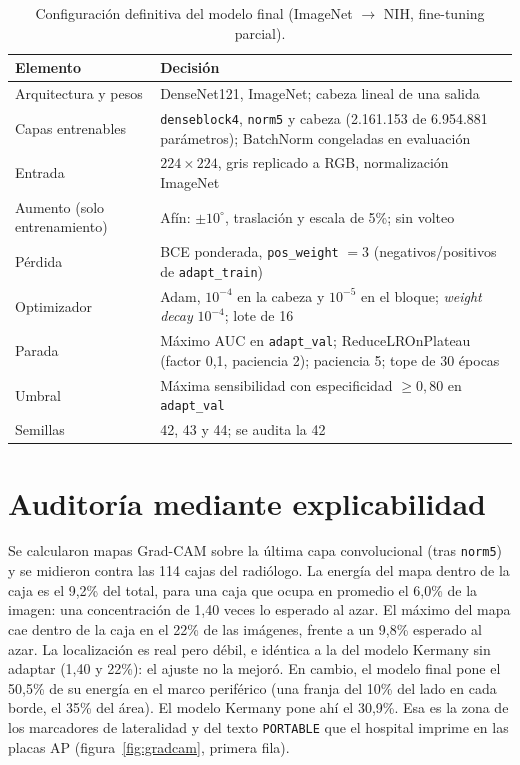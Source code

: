\documentclass[11pt]{article}
\begin{document}
\begin{table}[h]\centering\small
\caption{Configuración definitiva del modelo final (ImageNet $\rightarrow$ NIH, fine-tuning parcial).}\label{tab:config}
\begin{tabular}{ll}\toprule
Elemento & Decisión \\\midrule
Arquitectura y pesos & DenseNet121, ImageNet; cabeza lineal de una salida \\
Capas entrenables & \texttt{denseblock4}, \texttt{norm5} y cabeza (2.161.153 de 6.954.881 parámetros); BatchNorm congeladas en evaluación \\
Entrada & $224\times224$, gris replicado a RGB, normalización ImageNet \\
Aumento (solo entrenamiento) & Afín: $\pm10^\circ$, traslación y escala de 5\%; sin volteo \\
Pérdida & BCE ponderada, \texttt{pos\_weight} $=3$ (negativos/positivos de \texttt{adapt\_train}) \\
Optimizador & Adam, $10^{-4}$ en la cabeza y $10^{-5}$ en el bloque; \emph{weight decay} $10^{-4}$; lote de 16 \\
Parada & Máximo AUC en \texttt{adapt\_val}; ReduceLROnPlateau (factor 0,1, paciencia 2); paciencia 5; tope de 30 épocas \\
Umbral & Máxima sensibilidad con especificidad $\geq0{,}80$ en \texttt{adapt\_val} \\
Semillas & 42, 43 y 44; se audita la 42 \\\bottomrule
\end{tabular}
\end{table}

\section{Auditoría mediante explicabilidad}\label{sec:auditoria}
Se calcularon mapas Grad-CAM \parencite{selvaraju2017} sobre la última capa convolucional (tras \texttt{norm5}) y se midieron contra las 114 cajas del radiólogo. La energía del mapa dentro de la caja es el 9,2\% del total, para una caja que ocupa en promedio el 6,0\% de la imagen: una concentración de 1,40 veces lo esperado al azar. El máximo del mapa cae dentro de la caja en el 22\% de las imágenes, frente a un 9,8\% esperado al azar. La localización es real pero débil, e idéntica a la del modelo Kermany sin adaptar (1,40 y 22\%): el ajuste no la mejoró. En cambio, el modelo final pone el 50,5\% de su energía en el marco periférico (una franja del 10\% del lado en cada borde, el 35\% del área). El modelo Kermany pone ahí el 30,9\%. Esa es la zona de los marcadores de lateralidad y del texto \texttt{PORTABLE} que el hospital imprime en las placas AP (figura~\ref{fig:gradcam}, primera fila).
\end{document}
